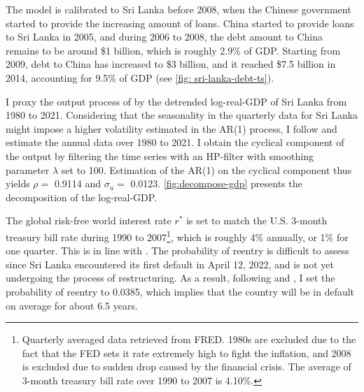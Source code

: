 The model is calibrated to Sri Lanka before 2008, when the Chinese government started to provide the increasing amount of loans.
China started to provide loans to Sri Lanka in 2005, and during 2006 to 2008, the debt amount to China remains to be around \$1 billion, which is roughly 2.9\% of GDP. Starting from 2009, debt to China has increased to \$3 billion, and it reached \$7.5 billion in 2014, accounting for 9.5\% of GDP
(see \autoref{fig: sri-lanka-debt-ts}).

I proxy the output process of  by the detrended log-real-GDP of Sri Lanka from 1980 to 2021. Considering that the seasonality in the quarterly data for Sri Lanka might impose a higher volatility estimated in the AR(1) process, I follow \citet{Hinrichsen_2020-chapter4} and estimate the annual data over 1980 to 2021. I obtain the cyclical component of the output by filtering the time series with an HP-filter with smoothing parameter $\lambda$ set to 100.
Estimation of the AR(1) on the cyclical component thus yields $\rho = $ 0.9114 and $\sigma_u = $ 0.0123\footnotemark{}. \autoref{fig:decompose-gdp} presents the decomposition of the log-real-GDP.

The global risk-free world interest rate $r^*$ is set to match the U.S. 3-month treasury bill rate during 1990 to 2007\footnote{
    Quarterly averaged data retrieved from FRED. 1980s are excluded due to the fact that the FED sets it rate extremely high to fight the inflation, and 2008 is excluded due to sudden drop caused by the financial crisis. The average of 3-month treasury bill rate over 1990 to 2007 is 4.10\%.
}, which is roughly 4\% annually, or 1\% for one quarter. This is in line with \citet{Chatterjee-12}.
The probability of reentry is difficult to assess since Sri Lanka encountered its first default in April 12, 2022, and is not yet undergoing the process of restructuring. As a result, following \citet*{Chatterjee-12} and \citet*{Hinrichsen_2020-chapter4}, I set the probability of reentry to 0.0385, which implies that the country will be in default on average for about 6.5 years.

